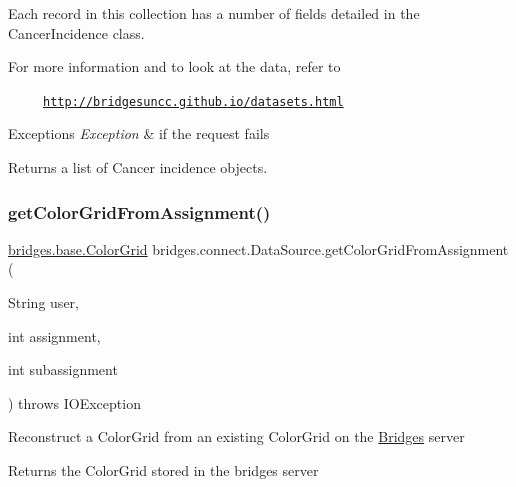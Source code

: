 Each record in this collection has a number of fields detailed in the Cancer\+Incidence class.

For more information and to look at the data, refer to 

~~~~~\href{http://bridgesuncc.github.io/datasets.html}{\tt http\+://bridgesuncc.\+github.\+io/datasets.\+html} 


\begin{DoxyExceptions}{Exceptions}
{\em Exception} & if the request fails\\
\hline
\end{DoxyExceptions}
\begin{DoxyReturn}{Returns}
a list of Cancer incidence objects. 
\end{DoxyReturn}
\mbox{\label{classbridges_1_1connect_1_1_data_source_a9556950d89b39ce61bead0879d1e2192}} 
\subsubsection{\texorpdfstring{get\+Color\+Grid\+From\+Assignment()}{getColorGridFromAssignment()}\hspace{0.1cm}{\footnotesize\ttfamily [1/2]}}
{\footnotesize\ttfamily \hyperlink{classbridges_1_1base_1_1_color_grid}{bridges.\+base.\+Color\+Grid} bridges.\+connect.\+Data\+Source.\+get\+Color\+Grid\+From\+Assignment (\begin{DoxyParamCaption}\item[{String}]{user,  }\item[{int}]{assignment,  }\item[{int}]{subassignment }\end{DoxyParamCaption}) throws I\+O\+Exception}

Reconstruct a Color\+Grid from an existing Color\+Grid on the \hyperlink{classbridges_1_1connect_1_1_bridges}{Bridges} server

\begin{DoxyReturn}{Returns}
the Color\+Grid stored in the bridges server 
\end{DoxyReturn}

